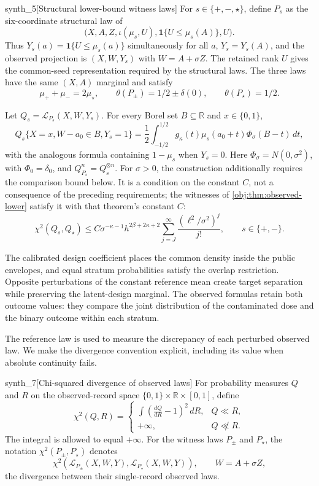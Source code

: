 \documentclass[11pt]{article}
\begin{document}
\begin{definitionv}{synth_5}[Structural lower-bound witness laws]
For \(s\in\{+,-,\star\}\), define \(P_s\) as the six-coordinate structural law of
\[
\bigl(X,A,Z,\iota(\mu_s,U),\mathbf1\{U\le\mu_s(A)\},U\bigr).
\]
Thus \(Y_s(a)=\mathbf1\{U\le\mu_s(a)\}\) simultaneously for all \(a\), \(Y_s=Y_s(A)\), and the observed projection is \((X,W,Y_s)\) with \(W=A+\sigma Z\). The retained rank \(U\) gives the common-seed representation required by the structural laws. The three laws have the same \((X,A)\) marginal and satisfy
\[
\mu_++\mu_-=2\mu_\star,\qquad
\theta(P_\pm)=1/2\pm\delta(0),\qquad \theta(P_\star)=1/2.
\]

Let \(Q_s=\mathcal L_{P_s}(X,W,Y_s)\). For every Borel set \(B\subseteq\mathbb R\) and \(x\in\{0,1\}\),
\[
Q_s\{X=x,W-a_0\in B,Y_s=1\}
=\frac12\int_{-1/2}^{1/2}g_\kappa(t)\mu_s(a_0+t)\Phi_\sigma(B-t)\,dt,
\]
with the analogous formula containing \(1-\mu_s\) when \(Y_s=0\). Here \(\Phi_\sigma=N(0,\sigma^2)\), with \(\Phi_0=\delta_0\), and \(Q_{P_s}^n=Q_s^{\otimes n}\). For \(\sigma>0\), the construction additionally requires the comparison bound below. It is a condition on the constant \(C\), not a consequence of the preceding requirements; the witnesses of \cref{obj:thm:observed-lower} satisfy it with that theorem's constant \(C\):
\[
\chi^2(Q_s,Q_\star)
\le C\sigma^{-\kappa-1}h^{2\beta+2\kappa+2}
\sum_{j=J}^{\infty}\frac{(\ell^2/\sigma^2)^j}{j!},
\qquad s\in\{+,-\}.
\]
\end{definitionv}

The calibrated design coefficient places the common density inside the public envelopes, and equal stratum probabilities satisfy the overlap restriction. Opposite perturbations of the constant reference mean create target separation while preserving the latent-design marginal. The observed formulas retain both outcome values: they compare the joint distribution of the contaminated dose and the binary outcome within each stratum.

The reference law is used to measure the discrepancy of each perturbed observed law. We make the divergence convention explicit, including its value when absolute continuity fails.

\begin{definitionv}{synth_7}[Chi-squared divergence of observed laws]
For probability measures \(Q\) and \(R\) on the observed-record space \(\{0,1\}\times\mathbb R\times[0,1]\), define
\[
\chi^2(Q,R)=
\begin{cases}
\displaystyle \int\left(\frac{dQ}{dR}-1\right)^2\,dR,
& Q\ll R,\\[4pt]
+\infty,& Q\not\ll R.
\end{cases}
\]
The integral is allowed to equal \(+\infty\). For the witness laws \(P_\pm\) and \(P_\star\), the notation \(\chi^2(P_\pm,P_\star)\) denotes
\[
\chi^2\!\left(\mathcal L_{P_\pm}(X,W,Y),
              \mathcal L_{P_\star}(X,W,Y)\right),
\qquad W=A+\sigma Z,
\]
the divergence between their single-record observed laws.
\end{definitionv}
\end{document}
